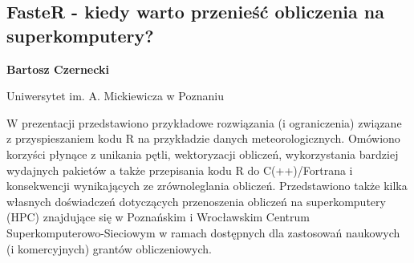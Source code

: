 \documentclass[\main/boa.tex]{subfiles}
\begin{document}
\subsection{FasteR - kiedy warto przenieść obliczenia na superkomputery?}

\begin{minipage}{0.915\textwidth}
	\centering
  {\bf {} Bartosz Czernecki}
\end{minipage}



\begin{affiliations}
\begin{minipage}{0.915\textwidth}
\centering
Uniwersytet im. A. Mickiewicza w Poznaniu  \\[-2pt]
\end{minipage}
\end{affiliations}

\vskip 0.3cm

W prezentacji przedstawiono przykładowe rozwiązania (i ograniczenia) związane \\ z przyspieszaniem kodu R na przykładzie danych meteorologicznych. Omówiono korzyści płynące z unikania pętli, wektoryzacji obliczeń, wykorzystania bardziej wydajnych pakietów a także przepisania kodu R do C(++)/Fortrana i konsekwencji wynikających ze zrównoleglania obliczeń. 
Przedstawiono także kilka własnych doświadczeń dotyczących przenoszenia obliczeń na superkomputery (HPC) znajdujące się w Poznańskim i Wrocławskim Centrum Superkomputerowo-Sieciowym w ramach dostępnych dla zastosowań naukowych (i komercyjnych) grantów obliczeniowych.
\end{document}
